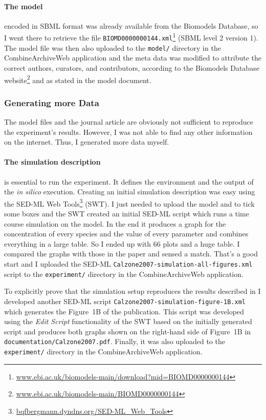 \paragraph{The model} encoded in SBML format was already available from the Biomodels Database, so I went there to retrieve the file \texttt{BIOMD0000000144.xml}\footnote{\href{http://www.ebi.ac.uk/biomodels-main/download?mid=BIOMD0000000144}{www.ebi.ac.uk/biomodels-main/download?mid=BIOMD0000000144}} (SBML level 2 version 1).
The model file was then also uploaded to the \texttt{model/} directory in the CombineArchiveWeb application and the meta data was modified to attribute the correct authors, curators, and contributors, according to the Biomodels Database website\footnote{\href{http://www.ebi.ac.uk/biomodels-main/BIOMD0000000144}{www.ebi.ac.uk/biomodels-main/BIOMD0000000144}} and as stated in the model document.


\subsubsection{Generating more Data}
The model files and the journal article are obviously not sufficient to reproduce the experiment's results.
However, I was not able to find any other information on the internet.
Thus, I generated more data myself.

\paragraph{The simulation description} is essential to run the experiment.
It defines the environment and the output of the \textit{in silico} execution.
Creating an initial simulation description was easy using the SED-ML Web Tools\footnote{\href{http://bqfbergmann.dyndns.org/SED-ML_Web_Tools}{bqfbergmann.dyndns.org/SED-ML\_Web\_Tools}} (SWT).
I just needed to upload the model and to tick some boxes and the SWT created an initial SED-ML script which runs a time course simulation on the model.
In the end it produces a graph for the concentration of every species and the value of every parameter and combines everything in a large table.
So I ended up with 66 plots and a huge table.
I compared the graphs with those in the paper and sensed a match.
That's a good start and I uploaded the SED-ML \texttt{Calzone2007-simulation-all-figures.xml} script to the \texttt{experiment/} directory in the CombineArchiveWeb application.

To explicitly prove that the simulation setup reproduces the results described in \cite{Calzone2007} I developed another SED-ML script \texttt{Calzone2007-simulation-figure-1B.xml} which generates the Figure~1B of the publication.
This script was developed using the \textit{Edit Script} functionality of the SWT based on the initially generated script and produces both graphs shown on the right-hand side of Figure~1B in \texttt{documentation/Calzone2007.pdf}.
Finally, it was also uploaded to the \texttt{experiment/} directory in the CombineArchiveWeb application.




